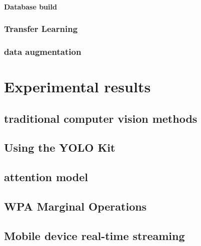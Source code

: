 \documentclass{article}
\begin{document}
\paragraph{Database build}

\subsubsection{Transfer Learning}

\subsubsection{data augmentation}

\section{Experimental results}


\subsection{traditional computer vision methods}
\subsection{Using the YOLO Kit}
\subsection{attention model}
\subsection{WPA Marginal Operations}
\subsection{Mobile device real-time streaming}
\end{document}
